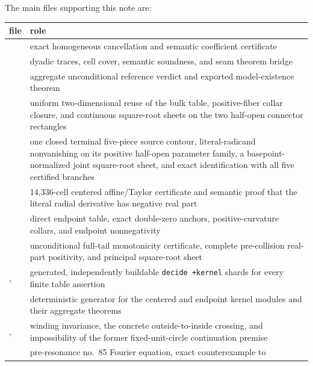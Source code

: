 \documentclass[11pt]{article}
\begin{document}
The main files supporting this note are:
\begin{center}
\begin{tabular}{L{0.43\textwidth}L{0.48\textwidth}}
\toprule
file & role\\
\midrule
{} & exact homogeneous cancellation and semantic
coefficient certificate\\
 & dyadic traces, cell cover, semantic soundness,
and seam theorem bridge\\
 & aggregate unconditional reference verdict and
exported model-existence theorem\\
 & uniform two-dimensional reuse of the bulk table,
positive-fiber collar closure, and continuous square-root sheets on the two half-open connector
rectangles\\
 & one closed terminal five-piece source contour,
literal-radicand nonvanishing on its positive half-open parameter family, a basepoint-normalized
joint square-root sheet, and exact identification with all five certified branches\\
 & 14,336-cell centered affine/Taylor
certificate and semantic proof that the literal radial derivative has negative real part\\
 & direct endpoint table, exact double-zero
anchors, positive-curvature collars, and endpoint nonnegativity\\
 & unconditional full-tail monotonicity certificate,
complete pre-collision real-part positivity, and principal square-root sheet\\
,  & generated,
independently buildable \texttt{decide +kernel} shards for every finite table assertion\\
 & deterministic generator for the centered and
endpoint kernel modules and their aggregate theorems\\
,  & winding invariance,
the concrete outside-to-inside crossing, and impossibility of the former fixed-unit-circle
continuation premise\\
 & pre-resonance no.~85 Fourier equation, exact counterexample to

\end{tabular}
\end{center}
\end{document}
